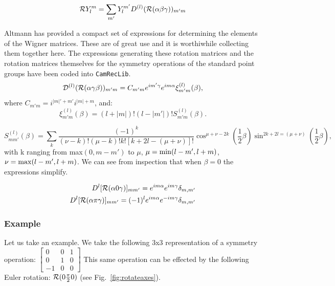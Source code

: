 \begin{equation}
{\mathcal{R}} Y_{l}^{m} = \sum_{m'} Y_{l}^{m'}D^{(l)}({\mathcal{R}}(\alpha\beta\gamma))_{m'm}
\end{equation}

Altmann\cite{altmann63a} has provided a compact set of expressions 
for determining the elements of the Wigner matrices. These are of 
great use and it is worthiwhile collecting them together here. The expressions
generating these rotation matrices and the rotation matrices themselves
for the symmetry operations of the standard point groups have been coded
into \texttt{CamRecLib}.
%
\begin{equation}
\mathcal{D}^{(l)}({\mathcal{R}}(\alpha\gamma\beta))_{m'm}= C_{m'm}e^{im'\gamma}e^{im\alpha}\xi^{(l)}_{m'm}(\beta),
\end{equation}
%
where $C_{m'm}=i^{|m|'+m'}i^{|m|+m}$, and:
%
\begin{equation}
\xi^{(l)}_{m'm}(\beta)= (l+|m|)!(l-|m'|)!S^(l)_{m'm}(\beta).
\end{equation}

\begin{equation}
S^{(l)}_{mm'}(\beta) = \sum_{k} \frac{(-1)^{k}}{(\nu-k)!(\mu-k)!k![k+2l-(\mu+\nu)]!} \cos^{\mu+\nu-2k}(\frac{1}{2}\beta) 
\sin^{2k+2l=(\mu+\nu)}(\frac{1}{2}\beta),
\end{equation}
%
with k ranging from max$(0,m-m')$ to $\mu$, $\mu={\rm min}(l-m',l+m)$, $\nu = {\rm max}(l-m',l+m)$. 
We can see from inspection that when $\beta=0$ the expressions simplify.

\begin{align}
D^{l}[{\mathcal{R}}(\alpha 0 \gamma)]_{mm'} = e^{im\alpha}e^{im\gamma}\delta_{m,m'} \\
D^{l}[{\mathcal{R}}(\alpha \pi \gamma)]_{mm'} = (-1)^{l}e^{im\alpha}e^{-im\gamma}\delta_{m,m'}
\end{align}

\subsubsection{Example}
Let us take an example. We take the following 3x3 
representation of a symmetry operation:
%
$\left[\begin{array}{ccc}
0  & 0 &  1 \\
0  & 1 &  0 \\
-1 & 0 &  0 	
\end{array}\right]$
%
This same operation can be effected by 
the following Euler rotation: ${\mathcal{R}}(0\frac{\pi}{2}0)$ 
(see Fig.~\ref{fig:rotateaxes}).

